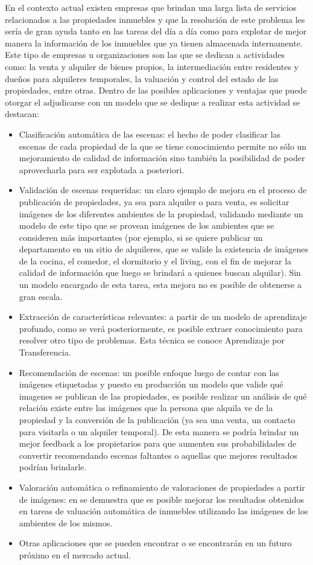 En el contexto actual existen empresas que brindan una larga lista de servicios relacionados a las propiedades inmuebles y que la resolución de este problema les sería de gran ayuda tanto en las tareas del día a día como para explotar de mejor manera la información de los inmuebles que ya tienen almacenada internamente. Este tipo de empresas u organizaciones son las que se dedican a actividades como: la venta y alquiler de bienes propios, la intermediación entre residentes y dueños para alquileres temporales, la valuación y control del estado de las propiedades, entre otras.
Dentro de las posibles aplicaciones y ventajas que puede otorgar el adjudicarse con un modelo que se dedique a realizar esta actividad se destacan:
\begin{itemize}
	\item Clasificación automática de las escenas: el hecho de poder clasificar las escenas de cada propiedad de la que se tiene conocimiento permite no sólo un mejoramiento de calidad de información sino también la posibilidad de poder aprovecharla para ser explotada a posteriori.
	\item Validación de escenas requeridas: un claro ejemplo de mejora en el proceso de publicación de propiedades, ya sea para alquiler o para venta, es solicitar imágenes de los diferentes ambientes de la propiedad, validando mediante un modelo de este tipo que se provean imágenes de los ambientes que se consideren más importantes (por ejemplo, si se quiere publicar un departamento en un sitio de alquileres, que se valide la existencia de imágenes de la cocina, el comedor, el dormitorio y el living, con el fin de mejorar la calidad de información que luego se brindará a quienes buscan alquilar). Sin un modelo encargado de esta tarea, esta mejora no es posible de obtenerse a gran escala.
	\item Extracción de características relevantes: a partir de un modelo de aprendizaje profundo, como se verá posteriormente, es posible extraer conocimiento para resolver otro tipo de problemas. Esta técnica se conoce Aprendizaje por Transferencia. 
	\item Recomendación de escenas: un posible enfoque luego de contar con las imágenes etiquetadas y puesto en producción un modelo que valide qué imagenes se publican de las propiedades, es posible realizar un análisis de qué relación existe entre las imágenes que la persona que alquila ve de la propiedad y la conversión de la publicación (ya sea una venta, un contacto para visitarla o un alquiler temporal). De esta manera se podría brindar un mejor feedback a los propietarios para que aumenten sus probabilidades de convertir recomendando escenas faltantes o aquellas que mejores resultados podrían brindarle.
	\item Valoración automática o refinamiento de valoraciones de propiedades a partir de imágenes: en \cite{vision_based_real_estate_price_estimation} se demuestra que es posible mejorar los resultados obtenidos en tareas de valuación automática de inmuebles utilizando las imágenes de los ambientes de los mismos. 
	\item Otras aplicaciones que se pueden encontrar o se encontrarán en un futuro próximo en el mercado actual.
\end{itemize}

